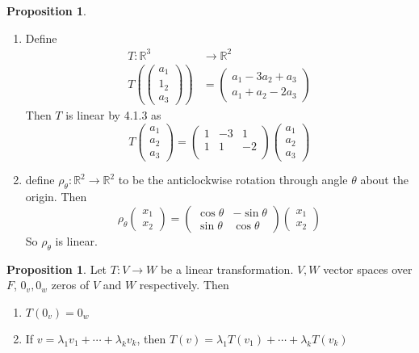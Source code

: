 \documentclass{report}
\theoremstyle{remark}
\theoremstyle{definition}
\theoremstyle{definition}
\theoremstyle{theorem}
\newtheorem{proposition}[theorem]{Proposition}
\begin{document}
\begin{proposition}
\begin{enumerate}[label=\alph*]
    \item Define 
    \begin{align*}
        T: \mathbb{R}^3 &\rightarrow \mathbb{R}^2\\
        T\left(\begin{pmatrix}
        a_1\\1_2\\a_3
        \end{pmatrix}\right) &= \begin{pmatrix}
        a_1-3a_2+a_3\\
        a_1+a_2-2a_3
        \end{pmatrix}
    \end{align*}
    Then $T$ is linear by 4.1.3 as
    \[T\begin{pmatrix}
    a_1\\a_2\\a_3
    \end{pmatrix}=\begin{pmatrix}
    1&-3&1\\
    1&1&-2\\
    \end{pmatrix}\begin{pmatrix}
    a_1\\a_2\\a_3
    \end{pmatrix}\]
    \item define $\rho_\theta:\mathbb{R}^2\rightarrow \mathbb{R}^2$ to be the anticlockwise rotation through angle $\theta$ about the origin. Then
    \[\rho_\theta\begin{pmatrix}x_1\\x_2\end{pmatrix}= \begin{pmatrix}
    \cos\theta&-\sin\theta\\\sin\theta&\cos\theta
    \end{pmatrix} \begin{pmatrix}x_1\\x_2\end{pmatrix}\]
    So $\rho_\theta$ is linear.
    \end{enumerate}
\end{proposition}
\begin{proposition}
Let $T:V\rightarrow W$ be a linear transformation. $V,W$ vector spaces over $F$, $0_v, 0_w$ zeros of $V$ and $W$ respectively. Then
\begin{enumerate}
    \item $T(0_v)=0_w$
    \item If $v = \lambda_1 v_1 + \cdots + \lambda_k v_k$, then $T(v)=\lambda_1 T(v_1) + \cdots + \lambda_k T(v_k)$
\end{enumerate}
\end{proposition}
\end{document}
